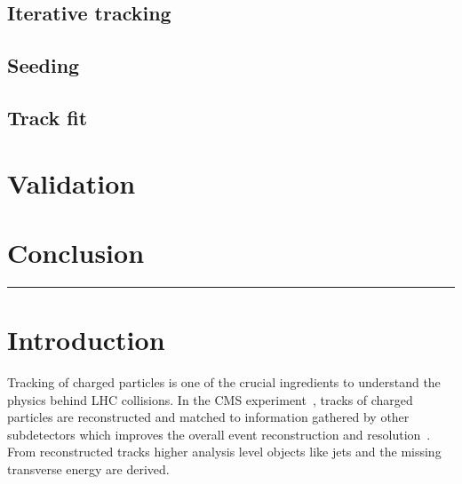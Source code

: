 \subsection{Iterative tracking}

\subsection{Seeding}


\subsection{Track fit}

\section{Validation}

\section{Conclusion}

\vspace{\baselineskip}
\hrule
\newpage

\section{Introduction}
Tracking of charged particles is one of the crucial ingredients to understand the physics behind LHC collisions. In the CMS experiment~\cite{Chatrchyan:2008aa}, tracks of charged particles are reconstructed and matched to information gathered by other subdetectors which improves the overall event reconstruction and resolution~\cite{CMS:2009nxa}. From reconstructed tracks higher analysis level objects like jets and the missing transverse energy are derived. 

